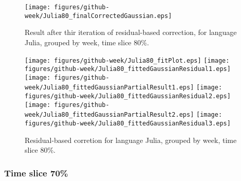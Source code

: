 \begin{figure}[]
\centering
{\texttt{[image: figures/github-week/Julia80\_finalCorrectedGaussian.eps]}}
\caption{Result after thir iteration of residual-based correction, for language Julia, grouped by week, time slice 80\%.}
\end{figure}


\begin{figure}[hb]
\centering
{}
{\texttt{[image: figures/github-week/Julia80\_fitPlot.eps]}}
{\texttt{[image: figures/github-week/Julia80\_fittedGaussianResidual1.eps]}}
{\texttt{[image: figures/github-week/Julia80\_fittedGaussianPartialResult1.eps]}}
{\texttt{[image: figures/github-week/Julia80\_fittedGaussianResidual2.eps]}}
{\texttt{[image: figures/github-week/Julia80\_fittedGaussianPartialResult2.eps]}}
{\texttt{[image: figures/github-week/Julia80\_fittedGaussianResidual3.eps]}}
\caption{Residual-based corretion for language Julia, grouped by week, time slice 80\%.}
\end{figure}


\clearpage 
\newpage 


\FloatBarrier

\subsubsection{Time slice 70\%}

